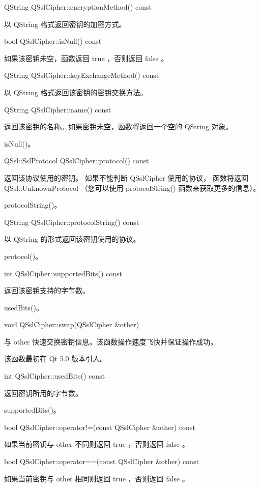 QString QSslCipher::encryptionMethod() const

以 QString 格式返回密钥的加密方式。

bool QSslCipher::isNull() const

如果该密钥未空，函数返回 true ，否则返回 false 。

QString QSslCipher::keyExchangeMethod() const

以 QString 格式返回该密钥的密钥交换方法。

QString QSslCipher::name() const

返回该密钥的名称。如果密钥未空，函数将返回一个空的 QString 对象。

\begin{seeAlso}
isNull()。
\end{seeAlso}

QSsl::SslProtocol QSslCipher::protocol() const

返回该协议使用的密钥。
如果不能判断 QSslCipher 使用的协议，
函数将返回 QSsl::UnknownProtocol 
（您可以使用 protocolString() 函数来获取更多的信息）。

\begin{seeAlso}
protocolString()。
\end{seeAlso}

QString QSslCipher::protocolString() const

以 QString 的形式返回该密钥使用的协议。

\begin{seeAlso}
protocol()。
\end{seeAlso}

int QSslCipher::supportedBits() const

返回该密钥支持的字节数。

\begin{seeAlso}
usedBits()。
\end{seeAlso}

void QSslCipher::swap(QSslCipher \&other)

与 other 快速交换密钥信息。该函数操作速度飞快并保证操作成功。

该函数最初在 Qt 5.0 版本引入。

int QSslCipher::usedBits() const

返回密钥所用的字节数。

\begin{seeAlso}
supportedBits()。
\end{seeAlso}

bool QSslCipher::operator!=(const QSslCipher \&other) const

如果当前密钥与 other 不同则返回 true ，否则返回 false 。

bool QSslCipher::operator==(const QSslCipher \&other) const

如果当前密钥与 other 相同则返回 true ，否则返回 false 。